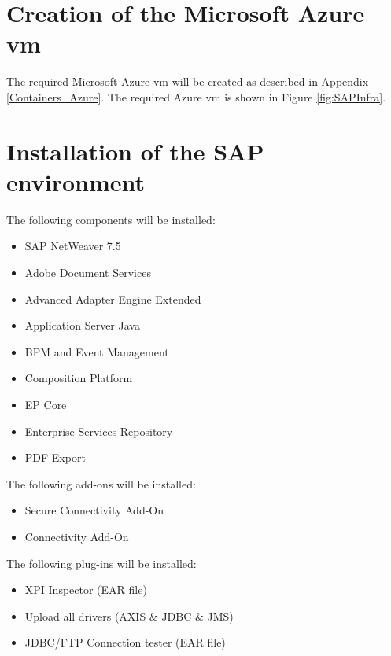 \label{SAPConfig}
\section{Creation of the Microsoft Azure \acrshort{vm}}
The required Microsoft Azure \acrshort{vm} will be created as described in Appendix \ref{Containers_Azure}. 
The required Azure \acrshort{vm} is shown in Figure \ref{fig:SAPInfra}.

\section{Installation of the SAP environment}
The following components will be installed:

\begin{itemize}
    \item SAP NetWeaver 7.5
    \item Adobe Document Services
    \item Advanced Adapter Engine Extended
    \item Application Server Java
    \item BPM and Event Management
    \item Composition Platform
    \item EP Core
    \item Enterprise Services Repository
    \item PDF Export 
\end{itemize}

The following add-ons will be installed:

\begin{itemize}
    \item Secure Connectivity Add-On
    \item Connectivity Add-On
\end{itemize}

The following plug-ins will be installed:

\begin{itemize}
    \item XPI Inspector (EAR file)
    \item Upload all drivers (AXIS \& JDBC \& JMS)
    \item JDBC/FTP Connection tester (EAR file)
\end{itemize}
